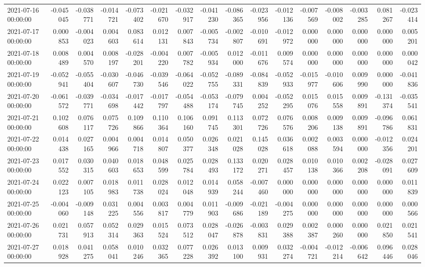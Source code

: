 \begin{tabular}{lrrrrrrrrrrrrrrr}
2021-07-16 00:00:00 & -0.045045 & -0.038771 & -0.014721 & -0.073402 & -0.021670 & -0.032917 & -0.041230 & -0.086365 & -0.023956 & -0.012136 & -0.007569 & -0.008002 & -0.003285 & 0.081267 & -0.023414 \\
2021-07-17 00:00:00 & 0.000853 & -0.004023 & 0.004603 & 0.083614 & 0.012131 & 0.007843 & -0.005734 & -0.002807 & -0.010691 & -0.012972 & 0.000000 & 0.000000 & 0.000000 & 0.000000 & 0.005201 \\
2021-07-18 00:00:00 & 0.008489 & 0.004570 & 0.008197 & -0.028201 & -0.004220 & 0.007782 & -0.005934 & 0.012000 & -0.011676 & 0.009574 & 0.000000 & 0.000000 & 0.000000 & 0.000000 & 0.000042 \\
2021-07-19 00:00:00 & -0.052941 & -0.055404 & -0.030607 & -0.046730 & -0.039546 & -0.064022 & -0.052755 & -0.089331 & -0.084839 & -0.052933 & -0.015977 & -0.010606 & 0.009990 & 0.000000 & -0.041836 \\
2021-07-20 00:00:00 & -0.061572 & -0.039771 & -0.034698 & -0.017442 & -0.017797 & -0.054488 & -0.053174 & -0.079745 & 0.004252 & -0.052295 & 0.015076 & 0.015558 & 0.009891 & -0.131374 & -0.035541 \\
2021-07-21 00:00:00 & 0.102608 & 0.076117 & 0.075726 & 0.109866 & 0.110364 & 0.106160 & 0.091745 & 0.113301 & 0.072726 & 0.076576 & 0.008206 & 0.009138 & 0.009891 & -0.096786 & 0.061831 \\
2021-07-22 00:00:00 & 0.014438 & 0.027165 & 0.004966 & 0.004718 & 0.014807 & 0.050377 & 0.026348 & 0.021028 & 0.145028 & 0.036618 & 0.002088 & 0.003594 & 0.000000 & -0.012356 & 0.024201 \\
2021-07-23 00:00:00 & 0.017552 & 0.030315 & 0.040603 & 0.018653 & 0.048599 & 0.025784 & 0.028493 & 0.133172 & 0.020271 & 0.028457 & 0.010138 & 0.010366 & 0.002208 & -0.028091 & 0.027609 \\
2021-07-24 00:00:00 & 0.022123 & 0.007105 & 0.018983 & 0.011738 & 0.028024 & 0.012048 & 0.014939 & 0.058244 & -0.007460 & 0.000000 & 0.000000 & 0.000000 & 0.000000 & 0.000000 & 0.011839 \\
2021-07-25 00:00:00 & -0.004060 & -0.009148 & 0.031225 & 0.004556 & 0.003817 & 0.004779 & 0.011903 & -0.009686 & -0.021189 & -0.004275 & 0.000000 & 0.000000 & 0.000000 & 0.000000 & 0.000566 \\
2021-07-26 00:00:00 & 0.021731 & 0.057913 & 0.052314 & 0.029363 & 0.015524 & 0.073512 & 0.028047 & -0.026878 & -0.003831 & 0.029388 & 0.002387 & 0.000260 & 0.000000 & 0.021850 & 0.021541 \\
2021-07-27 00:00:00 & 0.018928 & 0.041275 & 0.058041 & 0.010246 & 0.032365 & 0.077228 & 0.026392 & 0.013100 & 0.009931 & 0.032274 & -0.004721 & -0.012214 & -0.006642 & 0.096446 & 0.028046 \\

\end{tabular}
